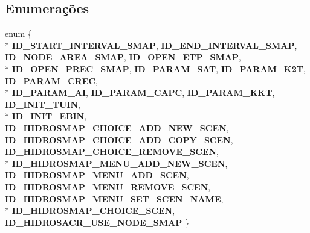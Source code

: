 \subsection*{Enumerações}
\begin{DoxyCompactItemize}
\item 
enum \{ \\*
{\bf I\+D\+\_\+\+S\+T\+A\+R\+T\+\_\+\+I\+N\+T\+E\+R\+V\+A\+L\+\_\+\+S\+M\+AP}, 
{\bf I\+D\+\_\+\+E\+N\+D\+\_\+\+I\+N\+T\+E\+R\+V\+A\+L\+\_\+\+S\+M\+AP}, 
{\bf I\+D\+\_\+\+N\+O\+D\+E\+\_\+\+A\+R\+E\+A\+\_\+\+S\+M\+AP}, 
{\bf I\+D\+\_\+\+O\+P\+E\+N\+\_\+\+E\+T\+P\+\_\+\+S\+M\+AP}, 
\\*
{\bf I\+D\+\_\+\+O\+P\+E\+N\+\_\+\+P\+R\+E\+C\+\_\+\+S\+M\+AP}, 
{\bf I\+D\+\_\+\+P\+A\+R\+A\+M\+\_\+\+S\+AT}, 
{\bf I\+D\+\_\+\+P\+A\+R\+A\+M\+\_\+\+K2T}, 
{\bf I\+D\+\_\+\+P\+A\+R\+A\+M\+\_\+\+C\+R\+EC}, 
\\*
{\bf I\+D\+\_\+\+P\+A\+R\+A\+M\+\_\+\+AI}, 
{\bf I\+D\+\_\+\+P\+A\+R\+A\+M\+\_\+\+C\+A\+PC}, 
{\bf I\+D\+\_\+\+P\+A\+R\+A\+M\+\_\+\+K\+KT}, 
{\bf I\+D\+\_\+\+I\+N\+I\+T\+\_\+\+T\+U\+IN}, 
\\*
{\bf I\+D\+\_\+\+I\+N\+I\+T\+\_\+\+E\+B\+IN}, 
{\bf I\+D\+\_\+\+H\+I\+D\+R\+O\+S\+M\+A\+P\+\_\+\+C\+H\+O\+I\+C\+E\+\_\+\+A\+D\+D\+\_\+\+N\+E\+W\+\_\+\+S\+C\+EN}, 
{\bf I\+D\+\_\+\+H\+I\+D\+R\+O\+S\+M\+A\+P\+\_\+\+C\+H\+O\+I\+C\+E\+\_\+\+A\+D\+D\+\_\+\+C\+O\+P\+Y\+\_\+\+S\+C\+EN}, 
{\bf I\+D\+\_\+\+H\+I\+D\+R\+O\+S\+M\+A\+P\+\_\+\+C\+H\+O\+I\+C\+E\+\_\+\+R\+E\+M\+O\+V\+E\+\_\+\+S\+C\+EN}, 
\\*
{\bf I\+D\+\_\+\+H\+I\+D\+R\+O\+S\+M\+A\+P\+\_\+\+M\+E\+N\+U\+\_\+\+A\+D\+D\+\_\+\+N\+E\+W\+\_\+\+S\+C\+EN}, 
{\bf I\+D\+\_\+\+H\+I\+D\+R\+O\+S\+M\+A\+P\+\_\+\+M\+E\+N\+U\+\_\+\+A\+D\+D\+\_\+\+S\+C\+EN}, 
{\bf I\+D\+\_\+\+H\+I\+D\+R\+O\+S\+M\+A\+P\+\_\+\+M\+E\+N\+U\+\_\+\+R\+E\+M\+O\+V\+E\+\_\+\+S\+C\+EN}, 
{\bf I\+D\+\_\+\+H\+I\+D\+R\+O\+S\+M\+A\+P\+\_\+\+M\+E\+N\+U\+\_\+\+S\+E\+T\+\_\+\+S\+C\+E\+N\+\_\+\+N\+A\+ME}, 
\\*
{\bf I\+D\+\_\+\+H\+I\+D\+R\+O\+S\+M\+A\+P\+\_\+\+C\+H\+O\+I\+C\+E\+\_\+\+S\+C\+EN}, 
{\bf I\+D\+\_\+\+H\+I\+D\+R\+O\+S\+A\+C\+R\+\_\+\+U\+S\+E\+\_\+\+N\+O\+D\+E\+\_\+\+S\+M\+AP}
 \}
\end{DoxyCompactItemize}
